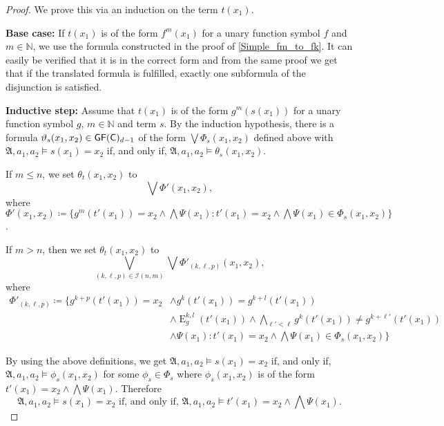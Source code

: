 \begin{proof}
	We prove this via an induction on the term $t(x_1)$.
	
	\textbf{Base case:}
	If $t(x_1)$ is of the form $f^{m}(x_1)$ for a unary function symbol $f$ and $m\in \mathbb N$, we use the formula constructed in the proof of \cref{Simple_fm_to_fk}.
	It can easily be verified that it is in the correct form and from the same proof we get that if the translated formula is fulfilled, exactly one subformula of the disjunction is satisfied.
	
	\textbf{Inductive step:}
	Assume that $t(x_1)$ is of the form $g^m(s(x_1))$ for a unary function symbol $g$, $m\in\mathbb N$ and term $s$.
	By the induction hypothesis, there is a formula $\vartheta_{s}(x_1,x_2)\in \mathsf{GF}(\mathsf{C})_{d-1}$ of the form $\bigvee \Phi_s(x_1,x_2)$ defined above with $\mathfrak A,a_1,a_2 \models s(x_1)=x_2$ if, and only if, $\mathfrak A,a_1,a_2\models \theta_{s}(x_1,x_2)$.
	
	If $m\leq n$, we set $\theta_{t}(x_1,x_2)$ to
	$$\bigvee \Phi'(x_1,x_2),$$
	where $\Phi'(x_1,x_2)\coloneqq\{g^{m}(t'(x_1))=x_2 \land \bigwedge \Psi(x_1) : t'(x_1)=x_2 \land \bigwedge \Psi(x_1)\in \Phi_s(x_1,x_2)\}$.
	
	If $m>n$, then we set $\theta_{t}(x_1,x_2)$ to
	$$\bigvee_{(k,\ell,p)\in \mathcal I(n,m)} \bigvee \Phi'_{(k,\ell,p)}(x_1,x_2),$$
	where 
	\begin{align*}
		\Phi'_{(k,\ell,p)}\coloneqq \{g^{k+p}(t'(x_1))=x_2 &\land g^{k}(t'(x_1))=g^{k+l}(t'(x_1)) \\
		& \land \operatorname{E}^{k,l}_g(t'(x_1)) \land \bigwedge_{\ell'<\ell} g^{k}(t'(x_1))\neq g^{k+\ell'}(t'(x_1)) \\
		& \land \Psi(x_1) : t'(x_1)=x_2 \land \bigwedge \Psi(x_1)\in \Phi_s(x_1,x_2)\}
	\end{align*}
	
	By using the above definitions, we get $\mathfrak A,a_1,a_2\models s(x_1)=x_2$ if, and only if, $\mathfrak A,a_1,a_2\models \phi_s(x_1,x_2)$ for some $\phi_s\in\Phi_s$ where $\phi_s(x_1,x_2)$ is of the form $t'(x_1)=x_2 \land \bigwedge \Psi(x_1)$.
	Therefore
	\begin{equation}
		\mathfrak A, a_1,a_2 \models s(x_1)=x_2 \text{ if, and only if, } \mathfrak A,a_1,a_2 \models t'(x_1)=x_2 \land \bigwedge \Psi(x_1).
		\label{Equivalence_s_and_tPsi}
	\end{equation}
	

\end{proof}
